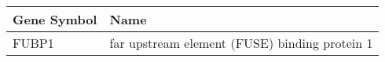 \begin{tabular}{ll}
\toprule
Gene Symbol &                                          Name \\
\midrule
      FUBP1 & far upstream element (FUSE) binding protein 1 \\
\bottomrule
\end{tabular}
